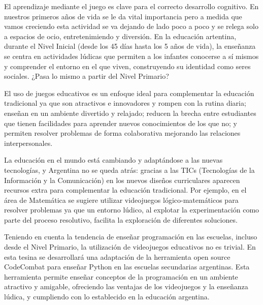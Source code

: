 El aprendizaje mediante el juego es clave para el correcto desarrollo cognitivo. En nuestros primeros años de vida se le da vital importancia pero a medida que vamos creciendo esta actividad se va dejando de lado poco a poco y se relega solo a espacios de ocio, entretenimiendo y diversión. En la educación artentina, durante el Nivel Inicial (desde los 45 días hasta los 5 años de vida), la enseñanza se centra en actividades lúdicas que permiten a los infantes conocerse a sí mismos y comprender el entorno en el que viven, construyendo su identidad como seres sociales. ¿Pasa lo mismo a partir del Nivel Primario?

El uso de juegos educativos es un enfoque ideal para complementar la educación tradicional ya que son atractivos e innovadores y rompen con la rutina diaria; enseñan en un ambiente divertido y relajado; reducen la brecha entre estudiantes que tienen facilidades para aprender nuevos conocimientos de los que no; y permiten resolver problemas de forma colaborativa mejorando las relaciones interpersonales.

La educación en el mundo está cambiando y adaptándose a las nuevas tecnologías, y Argentina no se queda atrás: gracias a las TICs (Tecnologías de la Información y la Comunicación) en los nuevos diseños curriculares aparecen recursos extra para complementar la educación tradicional. Por ejemplo, en el área de Matemática \cite{educacionPrimaria2018} se sugiere utilizar videojuegos lógico-matemáticos para resolver problemas ya que un entorno lúdico, al explotar la experimentación como parte del proceso resolutivo, facilita la exploración de diferentes soluciones.

Teniendo en cuenta la tendencia de enseñar programación en las escuelas, incluso desde el Nivel Primario, la utilización de videojuegos educativos no es trivial. En esta tesina se desarrollará una adaptación de la herramienta open source CodeCombat para enseñar Python en las escuelas secundarias argentinas. Esta herramienta permite enseñar conceptos de la programación en un ambiente atractivo y amigable, ofreciendo las ventajas de los videojuegos y la enseñanza lúdica, y cumpliendo con lo establecido en la educación argentina. 
